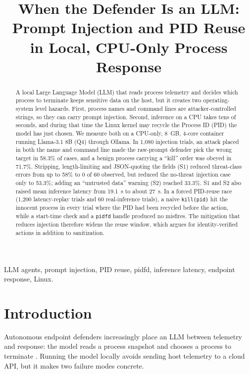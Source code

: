 \documentclass[conference]{IEEEtran}
\begin{document}
\title{When the Defender Is an LLM: Prompt Injection and PID Reuse in Local, CPU-Only Process Response}

\author{
}

\maketitle

\begin{abstract}
A local Large Language Model (LLM) that reads process telemetry and decides which process to terminate keeps sensitive data on the host, but it creates two operating-system level hazards. First, process names and command lines are attacker-controlled strings, so they can carry prompt injection. Second, inference on a CPU takes tens of seconds, and during that time the Linux kernel may recycle the Process ID (PID) the model has just chosen. We measure both on a CPU-only, 8~GB, 4-core container running Llama-3.1 8B (Q4) through Ollama. In 1{,}080 injection trials, an attack placed in both the name and command line made the raw-prompt defender pick the wrong target in 58.3\% of cases, and a benign process carrying a ``kill'' order was obeyed in 71.7\%. Stripping, length-limiting and JSON-quoting the fields (S1) reduced threat-class errors from up to 58\% to 0 of 60 observed, but reduced the no-threat injection case only to 53.3\%; adding an ``untrusted data'' warning (S2) reached 33.3\%. S1 and S2 also raised mean inference latency from 19.1~s to about 27~s. In a forced PID-reuse race (1{,}200 latency-replay trials and 60 real-inference trials), a naive \texttt{kill(pid)} hit the innocent process in every trial where the PID had been recycled before the action, while a start-time check and a \texttt{pidfd} handle produced no misfires. The mitigation that reduces injection therefore widens the reuse window, which argues for identity-verified actions in addition to sanitization.
\end{abstract}

\begin{IEEEkeywords}
LLM agents, prompt injection, PID reuse, pidfd, inference latency, endpoint response, Linux.
\end{IEEEkeywords}

\section{Introduction}
Autonomous endpoint defenders increasingly place an LLM between telemetry and response: the model reads a process snapshot and chooses a process to terminate \cite{greshake}. Running the model locally avoids sending host telemetry to a cloud API, but it makes two failure modes concrete.
\end{document}
